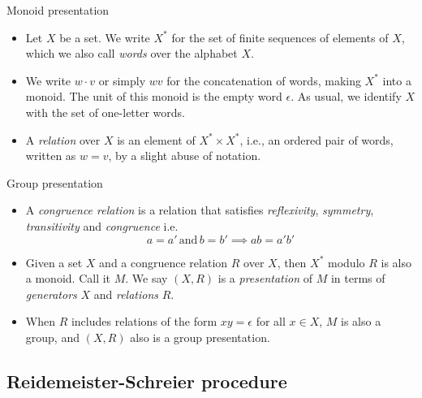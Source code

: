 \documentclass[compress,noamsthm,hyperref={bookmarksopen=true},aspectratio=169]{beamer}
\begin{document}
\begin{frame}{Monoid presentation}
  \vspace{1em}
  \begin{itemize}
    \setlength\itemsep{1em}
  \item Let $X$ be a set. We write $X^*$ for the set of finite sequences of
    elements of $X$, which we also call {\em words} over the alphabet $X$.
    \item We write $w\cdot v$ or simply $wv$ for the concatenation of words,
making $X^*$ into a monoid. The unit of this monoid is the empty word
$\epsilon$. As usual, we identify $X$ with the set of one-letter words.

\item A {\em relation} over $X$ is an element of $X^*\times X^*$, i.e., an
ordered pair of words, written as $w = v$, by a slight abuse of notation.

\end{itemize}
\end{frame}

\begin{frame}{Group presentation}
  \vspace{1em}
  \begin{itemize}
    \setlength\itemsep{1em}

\item A {\em congruence relation} is a relation that satisfies {\em reflexivity}, {\em symmetry}, {\em transitivity} and {\em congruence} i.e.
  \[a = a'\, \text{and}\, b = b' \implies ab = a'b'\]
\item Given a set $X$ and a congruence relation $R$ over $X$, then $X^*$ modulo $R$ is also a monoid. Call it $M$. We say $(X, R)$ is a {\em presentation} of $M$ in terms of {\em generators} $X$ and {\em relations} $R$.

  \item When $R$ includes relations of the form $xy = \epsilon$ for all $x \in X$, $M$ is also a group, and $(X,R)$ also is a group presentation.

\end{itemize}
\end{frame}


\subsection{Reidemeister-Schreier procedure}
\end{document}
